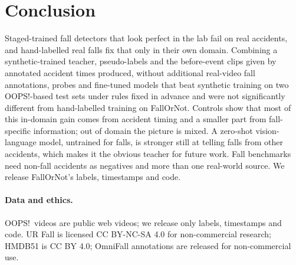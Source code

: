 \documentclass[10pt,twocolumn,letterpaper]{article}
\begin{document}
\section{Conclusion}
Staged-trained fall detectors that look perfect in the lab fail on real accidents, and hand-labelled real falls fix that only in their own domain. Combining a synthetic-trained teacher, pseudo-labels and the before-event clips given by annotated accident times produced, without additional real-video fall annotations, probes and fine-tuned models that beat synthetic training on two OOPS!-based test sets under rules fixed in advance and were not significantly different from hand-labelled training on FallOrNot. Controls show that most of this in-domain gain comes from accident timing and a smaller part from fall-specific information; out of domain the picture is mixed. A zero-shot vision-language model, untrained for falls, is stronger still at telling falls from other accidents, which makes it the obvious teacher for future work. Fall benchmarks need non-fall accidents as negatives and more than one real-world source. We release FallOrNot's labels, timestamps and code.

\paragraph{Data and ethics.} OOPS!\ videos are public web videos; we release only labels, timestamps and code. UR Fall is licensed CC BY-NC-SA 4.0 for non-commercial research; HMDB51 is CC BY 4.0; OmniFall annotations are released for non-commercial use.
\end{document}
